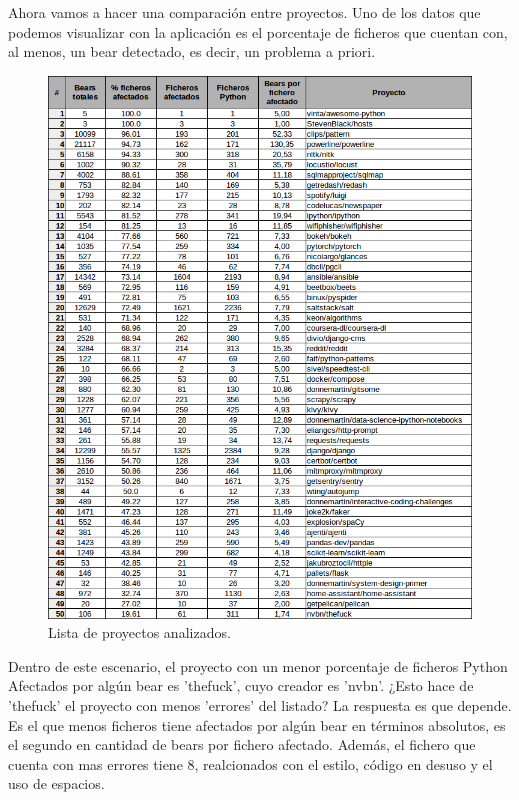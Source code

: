 \documentclass[a4paper, 12pt]{book}
\begin{document}
Ahora vamos a hacer una comparación entre proyectos. Uno de los datos que podemos visualizar con la aplicación es el porcentaje de ficheros que cuentan con, al menos, un bear detectado, es decir, un problema a priori.
\begin{figure}[H]
  \centering
  \includegraphics[width=15cm, keepaspectratio]{img/anexoTabla}
  \caption{Lista de proyectos analizados.}
  \label{fig:anexoTabla}
\end{figure}

Dentro de este escenario, el proyecto con un menor porcentaje de ficheros Python Afectados por algún bear es 'thefuck', cuyo creador es 'nvbn'. ¿Esto hace de 'thefuck' el proyecto con menos 'errores' del listado? La respuesta es que depende. Es el que menos ficheros tiene afectados por algún bear en términos absolutos, es el segundo en cantidad de bears por fichero afectado. Además, el fichero que cuenta con mas errores tiene 8, realcionados con el estilo, código en desuso y el uso de espacios.
\end{document}
